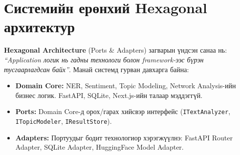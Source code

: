 \section{Системийн ерөнхий Hexagonal архитектур}

\textbf{Hexagonal Architecture} (Ports \& Adapters) загварын үндсэн санаа нь: \textit{``Application логик нь гадны технологи болон framework-ээс бүрэн тусгаарлагдсан байх''}. Манай системд гурван давхарга байна:

\begin{itemize}
    \item \textbf{Domain Core:} NER, Sentiment, Topic Modeling, Network Analysis-ийн бизнес логик. FastAPI, SQLite, Next.js-ийн талаар мэддэггүй.
    \item \textbf{Ports:} Domain Core-д орох/гарах хийсвэр интерфейс (\texttt{ITextAnalyzer}, \texttt{ITopicModeler}, \texttt{IResultStore}).
    \item \textbf{Adapters:} Портуудыг бодит технологиор хэрэгжүүлнэ: FastAPI Router Adapter, SQLite Adapter, HuggingFace Model Adapter.
\end{itemize}

